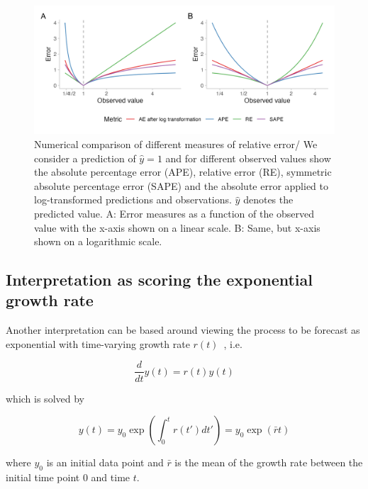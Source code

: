 \documentclass{article}
\begin{document}
\begin{figure}[h!]
\centering
\includegraphics[width = 1\textwidth]{output/figures/different-relative-errors.png}
\caption{Numerical comparison of different measures of relative error/ We consider a prediction of $\hat{y} = 1$ and for different observed values show the  absolute percentage error (APE), relative error (RE), symmetric absolute percentage error (SAPE) and the absolute error applied to log-transformed predictions and observations. $\hat{y}$ denotes the predicted value. A: Error measures as a function of the observed value with the x-axis shown on a linear scale. B: Same, but x-axis shown on a logarithmic scale.}
\label{fig:SAPE}
\end{figure}





\subsection{Interpretation as scoring the exponential growth rate}
\label{sec:methods:growthrate}

Another interpretation can be based around viewing the process to be forecast as exponential with time-varying growth rate $r(t)$~\citep[see, e.g.,][]{wallingaHowGenerationIntervals2007}, i.e.
\begin{linenomath*}
\begin{equation*}
\frac{d}{dt}y(t) = r(t)y(t)
\end{equation*}
\end{linenomath*}
%
which is solved by
%
\begin{linenomath*}
\begin{equation*}
y(t) = y_0 \exp \left( \int_0^t r(t') dt' \right) = y_0 \exp (\bar{r}t)
\end{equation*}
\end{linenomath*}
where $y_0$ is an initial data point and $\bar{r}$ is the mean of the growth rate between the initial time point $0$ and time $t$.
\end{document}
